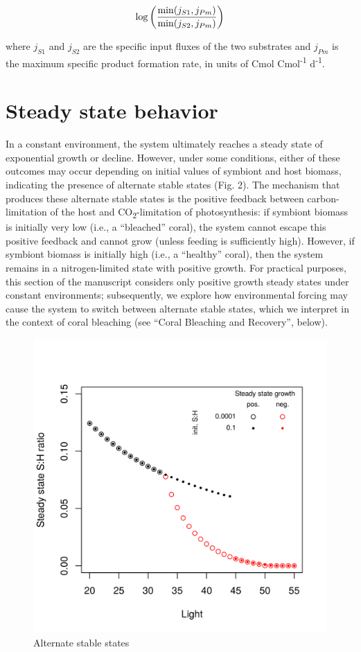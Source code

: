 \documentclass[]{elsarticle} %
\makeatletter
\def\maxwidth{\ifdim\Gin@nat@width>\linewidth\linewidth
\else\Gin@nat@width\fi}
\let\Oldincludegraphics\includegraphics
\renewcommand{\includegraphics}[1]{\Oldincludegraphics[width=\maxwidth]{#1}}
\makeatother
\begin{document}
\begin{equation} \log \bigg({{\min(j_{S1}, j_{Pm})} \over {\min(j_{S2}, j_{Pm})}}\bigg) \end{equation}

where \(j_{S1}\) and \(j_{S2}\) are the specific input fluxes of the two
substrates and \(j_{Pm}\) is the maximum specific product formation
rate, in units of Cmol Cmol\textsuperscript{-1} d\textsuperscript{-1}.

\section{Steady state behavior}\label{steady-state-behavior}

In a constant environment, the system ultimately reaches a steady state
of exponential growth or decline. However, under some conditions, either
of these outcomes may occur depending on initial values of symbiont and
host biomass, indicating the presence of alternate stable states (Fig.
2). The mechanism that produces these alternate stable states is the
positive feedback between carbon-limitation of the host and
CO\textsubscript{2}-limitation of photosynthesis: if symbiont biomass is
initially very low (i.e., a ``bleached'' coral), the system cannot
escape this positive feedback and cannot grow (unless feeding is
sufficiently high). However, if symbiont biomass is initially high
(i.e., a ``healthy'' coral), then the system remains in a
nitrogen-limited state with positive growth. For practical purposes,
this section of the manuscript considers only positive growth steady
states under constant environments; subsequently, we explore how
environmental forcing may cause the system to switch between alternate
stable states, which we interpret in the context of coral bleaching (see
``Coral Bleaching and Recovery'', below).

\begin{figure}[htbp]
\centering
\includegraphics{../img/Fig2.png}
\caption{Alternate stable states}
\end{figure}
\end{document}
